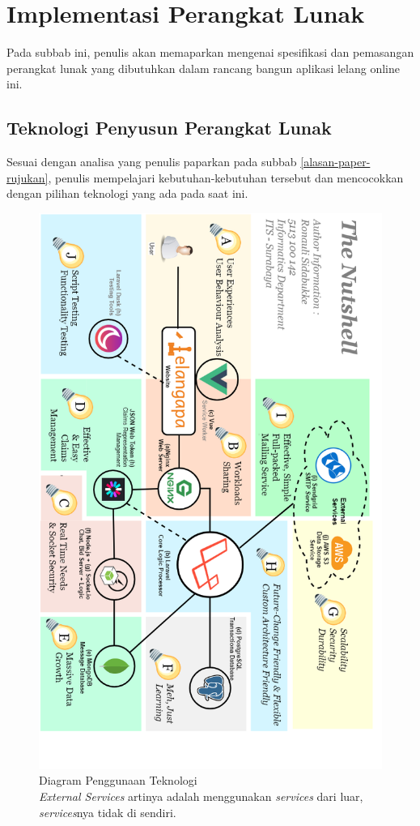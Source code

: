 
\section{Implementasi Perangkat Lunak}
Pada subbab ini, penulis akan memaparkan mengenai spesifikasi dan pemasangan perangkat lunak yang dibutuhkan dalam rancang bangun aplikasi lelang online ini.
  
\subsection{Teknologi Penyusun Perangkat Lunak}
\label{arsitektur-pl-final}
Sesuai dengan analisa yang penulis paparkan pada subbab \ref{alasan-paper-rujukan}, penulis mempelajari kebutuhan-kebutuhan tersebut dan mencocokkan dengan pilihan teknologi yang ada pada saat ini. 
\begin{figure}[H]
  	\centering
  	\includegraphics[height=0.8\paperheight]{images/bab3/diagram/arsitektur-colorized.png}
  	\caption{Diagram Penggunaan Teknologi \\
  		\textit{External Services} artinya adalah menggunakan \textit{services} dari luar, \textit{services}nya tidak di sendiri.}
  	\label{arsitektur-app}
\end{figure}
  
